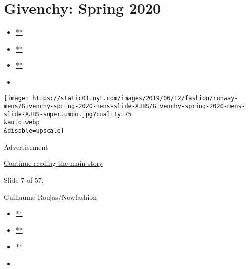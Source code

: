 \hypertarget{givenchy-spring-2020}{%
\section{Givenchy: Spring 2020}\label{givenchy-spring-2020}}

\begin{itemize}
\item
  \href{https://www.facebook.com/sharer.php?app_id=9869919170\&u=https\%3A\%2F\%2Fwww.nytimes.com\%2Fslideshow\%2F2019\%2F06\%2F12\%2Ffashion\%2Frunway-mens\%2Fgivenchy-spring-2020.html\%3Fsmid\%3Dfb-share\&name=Givenchy\%3A\%20Spring\%202020\&redirect_uri=https\%3A\%2F\%2Fwww.facebook.com\%2F}{**}
\item
  \href{https://twitter.com/intent/tweet?url=https\%3A\%2F\%2Fwww.nytimes.com\%2Fslideshow\%2F2019\%2F06\%2F12\%2Ffashion\%2Frunway-mens\%2Fgivenchy-spring-2020.html\%3Fsmid\%3Dtw-share\&text=Givenchy\%3A\%20Spring\%202020}{**}
\item
  \href{mailto:?subject=NYTimes.com\%3A\%20Givenchy\%3A\%20Spring\%202020\&body=From\%20The\%20New\%20York\%20Times\%3A\%0A\%0AGivenchy\%3A\%20Spring\%202020\%0A\%0AGivenchy\%20Spring\%202020\%20Collection.\%0A\%0Ahttps\%3A\%2F\%2Fwww.nytimes.com\%2Fslideshow\%2F2019\%2F06\%2F12\%2Ffashion\%2Frunway-mens\%2Fgivenchy-spring-2020.html\%3Fsmid\%3Dem-share}{**}
\item
\end{itemize}

\texttt{[image: https://static01.nyt.com/images/2019/06/12/fashion/runway-mens/Givenchy-spring-2020-mens-slide-XJBS/Givenchy-spring-2020-mens-slide-XJBS-superJumbo.jpg?quality=75\\\&auto=webp\\\&disable=upscale]}

Advertisement

\protect\hyperlink{after-right-6}{Continue reading the main story}

Slide 7 of 57,

Guillaume Roujas/Nowfashion

\begin{itemize}
\item
  \href{https://www.facebook.com/sharer.php?app_id=9869919170\&u=https\%3A\%2F\%2Fwww.nytimes.com\%2Fslideshow\%2F2019\%2F06\%2F12\%2Ffashion\%2Frunway-mens\%2Fgivenchy-spring-2020.html\%3Fsmid\%3Dfb-share\&name=Givenchy\%3A\%20Spring\%202020\&redirect_uri=https\%3A\%2F\%2Fwww.facebook.com\%2F}{**}
\item
  \href{https://twitter.com/intent/tweet?url=https\%3A\%2F\%2Fwww.nytimes.com\%2Fslideshow\%2F2019\%2F06\%2F12\%2Ffashion\%2Frunway-mens\%2Fgivenchy-spring-2020.html\%3Fsmid\%3Dtw-share\&text=Givenchy\%3A\%20Spring\%202020}{**}
\item
  \href{mailto:?subject=NYTimes.com\%3A\%20Givenchy\%3A\%20Spring\%202020\&body=From\%20The\%20New\%20York\%20Times\%3A\%0A\%0AGivenchy\%3A\%20Spring\%202020\%0A\%0AGivenchy\%20Spring\%202020\%20Collection.\%0A\%0Ahttps\%3A\%2F\%2Fwww.nytimes.com\%2Fslideshow\%2F2019\%2F06\%2F12\%2Ffashion\%2Frunway-mens\%2Fgivenchy-spring-2020.html\%3Fsmid\%3Dem-share}{**}
\item
\end{itemize}

